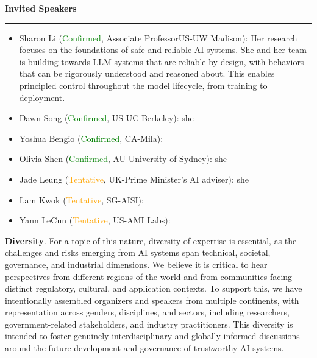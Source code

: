 \documentclass{article}
\newcommand{\sectiontitle}[1]{\noindent\textbf{\textcolor{neuripsblue}{#1}}\vspace{0.1cm}\hrule\vspace{0.2cm}}
\begin{document}
\sectiontitle{Invited Speakers}
\begin{itemize}
    \item Sharon Li (\textcolor{green}{Confirmed}, Associate Professor\@ US-UW Madison): Her research focuses on the foundations of safe and reliable AI systems. She and her team is building towards LLM systems that are reliable by design, with behaviors that can be rigorously understood and reasoned about. This enables principled control throughout the model lifecycle, from training to deployment. 
    \item Dawn Song (\textcolor{green}{Confirmed}, US-UC Berkeley): she
    \item Yoshua Bengio (\textcolor{green}{Confirmed}, CA-Mila):
    \item Olivia Shen (\textcolor{green}{Confirmed}, AU-University of Sydney): she
    \item Jade Leung (\textcolor{orange}{Tentative}, UK-Prime Minister’s AI adviser): she
    \item Lam Kwok (\textcolor{orange}{Tentative}, SG-AISI):
    \item Yann LeCun (\textcolor{orange}{Tentative}, US-AMI Labs):
\end{itemize}
\textbf{Diversity}. For a topic of this nature, diversity of expertise is essential, as the challenges and risks emerging from AI systems span technical, societal, governance, and industrial dimensions. We believe it is critical to hear perspectives from different regions of the world and from communities facing distinct regulatory, cultural, and application contexts. To support this, we have intentionally assembled organizers and speakers from multiple continents, with representation across genders, disciplines, and sectors, including researchers, government-related stakeholders, and industry practitioners. This diversity is intended to foster genuinely interdisciplinary and globally informed discussions around the future development and governance of trustworthy AI systems.
\end{document}
